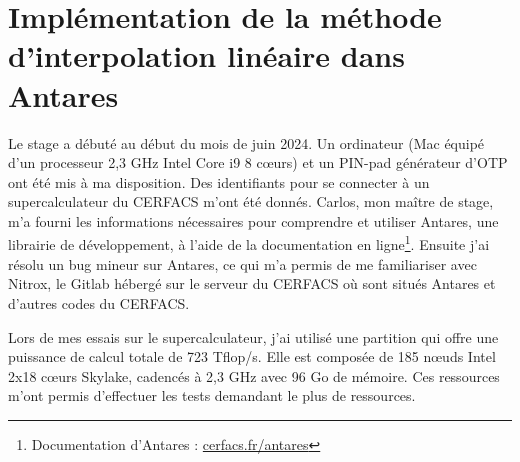 \chapter{Implémentation de la méthode d'interpolation linéaire dans Antares}




Le stage a débuté au début du mois de juin 2024. Un ordinateur (Mac équipé d'un processeur 2,3 GHz Intel Core i9 8 cœurs) et un PIN-pad générateur d'\ac{OTP} ont été mis à ma disposition. Des identifiants pour se connecter à un supercalculateur du CERFACS m'ont été donnés. Carlos, mon maître de stage, m'a fourni les informations nécessaires pour comprendre et utiliser Antares, une librairie de développement, à l'aide de la documentation en ligne\footnote{Documentation d'Antares : \href{https://cerfacs.fr/antares/}{cerfacs.fr/antares}}. Ensuite j'ai résolu un bug mineur sur Antares, ce qui m'a permis de me familiariser avec Nitrox, le Gitlab hébergé sur le serveur du CERFACS où sont situés Antares et d'autres codes du CERFACS.

Lors de mes essais sur le supercalculateur, j'ai utilisé une partition qui offre une puissance de calcul totale de 723 Tflop/s. Elle est composée de 185 nœuds Intel 2x18 cœurs Skylake, cadencés à 2,3 GHz avec 96 Go de mémoire. Ces ressources m'ont permis d'effectuer les tests demandant le plus de ressources.

